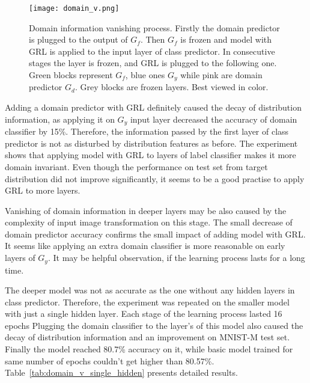 \documentclass{article}
\begin{document}
\begin{figure}
    \centering
    \vspace*{-3cm}
    \texttt{[image: domain\_v.png]}%
    \caption{Domain information vanishing process. Firstly the domain predictor is plugged to the output of $G_{f}$. Then $G_{f}$ is frozen and model with GRL is applied to the input layer of class predictor. In consecutive stages the layer is frozen, and GRL is plugged to the following one. Green blocks represent $G_{f}$, blue ones $G_{y}$ while pink are domain predictor $G_{d}$. Grey blocks are frozen layers. Best viewed in color.}
    \label{fig:domain_v}%
\end{figure}

\par
Adding a domain predictor with GRL definitely caused the decay of distribution information, as applying it on $G_{y}$ input layer decreased the accuracy of domain classifier by 15\%. Therefore, the information passed by the first layer of class predictor is not as disturbed by distribution features as before. The experiment shows that applying model with GRL to layers of label classifier makes it more domain invariant. Even though the performance on test set from target distribution did not improve significantly, it seems to be a good practise to apply GRL to more layers.
\par
Vanishing of domain information in deeper layers may be also caused by the complexity of input image transformation on this stage. The small decrease of domain predictor accuracy confirms the small impact of adding model with GRL. It seems like applying an extra domain classifier is more reasonable on early layers of $G_{y}$. It may be helpful observation, if the learning process lasts for a long time. 
\par
The deeper model was not as accurate as the one without any hidden layers in class predictor. Therefore, the experiment was repeated on the smaller model with just a single hidden layer. Each stage of the learning process lasted 16 epochs Plugging the domain classifier to the layer's of this model also caused the decay of distribution information and an improvement on MNIST-M test set. Finally the model reached 80.7\% accuracy on it, while basic model trained for same number of epochs couldn't get higher than 80.57\%. Table~\ref{tab:domain_v_single_hidden} presents detailed results.
\end{document}
